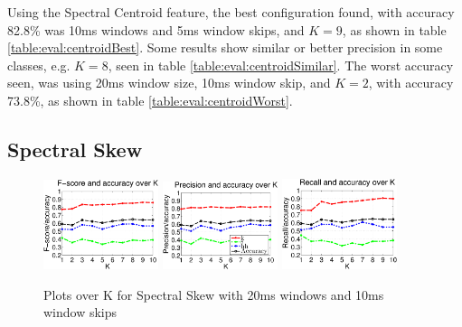 		Using the Spectral Centroid feature, the best configuration found, with accuracy 82.8\% was 10ms windows and 5ms window skips, and $K=9$, as shown in table \ref{table:eval:centroidBest}. Some results show similar or better precision in some classes, e.g. $K=8$, seen in table \ref{table:eval:centroidSimilar}. The worst accuracy seen, was using 20ms window size, 10ms window skip, and $K=2$, with accuracy 73.8\%, as shown in table \ref{table:eval:centroidWorst}.
		
				
	\subsection{Spectral Skew}
			
		\begin{figure}
			\centering\includegraphics[width=0.3\textwidth]{tex/appendices/test/sskew2010FP.png}
			\centering\includegraphics[width=0.3\textwidth]{tex/appendices/test/sskew2010_P.png}
			\centering\includegraphics[width=0.3\textwidth]{tex/appendices/test/sskew2010_R.png}
			
			\caption{Plots over K for Spectral Skew with 20ms windows and 10ms window skips}
		\end{figure}
		
